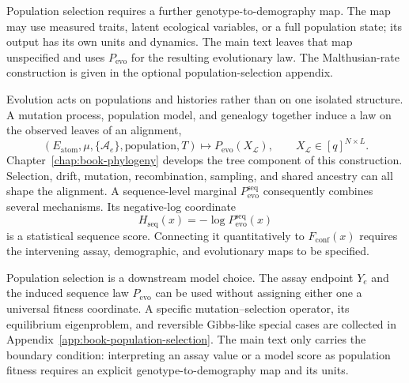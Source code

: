 Population selection requires a further genotype-to-demography map.  The map may use measured traits,
latent ecological variables, or a full population state; its output has its own units and dynamics.
The main text leaves that map unspecified and uses $P_{\mathrm{evo}}$ for the resulting evolutionary
law.  The Malthusian-rate construction is given in the optional population-selection appendix.

Evolution acts on populations and histories rather than on one isolated structure.  A mutation
process, population model, and genealogy together induce a law on the observed leaves
of an alignment,
\begin{equation}
(E_{\mathrm{atom}},\mu,\{\mathcal A_e\},\text{population},T)
\longmapsto
P_{\mathrm{evo}}(X_{\mathcal L}),
\qquad X_{\mathcal L}\in[q]^{N\times L}.
\label{eq:book-scale-evolutionary-law}
\end{equation}
Chapter~\ref{chap:book-phylogeny} develops the tree component of this construction.  Selection,
drift, mutation, recombination, sampling, and shared ancestry can all shape the alignment.  A
sequence-level marginal
$P_{\mathrm{evo}}^{\mathrm{seq}}$ consequently combines several mechanisms.  Its negative-log
coordinate
\begin{equation}
H_{\mathrm{seq}}(x)=-\log P_{\mathrm{evo}}^{\mathrm{seq}}(x)
\label{eq:book-scale-sequence-surprisal}
\end{equation}
is a statistical sequence score.  Connecting it quantitatively to
$F_{\mathrm{conf}}(x)$ requires the intervening assay, demographic, and evolutionary maps to be
specified.

Population selection is a downstream model choice.  The assay endpoint $Y_e$ and the induced sequence
law $P_{\mathrm{evo}}$ can be used without assigning either one a universal fitness coordinate.  A
specific mutation--selection operator, its equilibrium eigenproblem, and reversible Gibbs-like special
cases are collected in Appendix~\ref{app:book-population-selection}.  The main text only carries the
boundary condition: interpreting an assay value or a model score as population fitness requires an
explicit genotype-to-demography map and its units.

